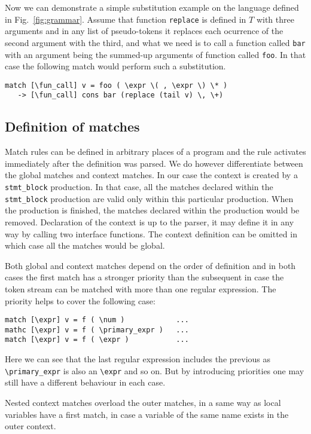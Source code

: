 Now we can demonstrate a simple substitution example on the language
defined in Fig.~\ref{fig:grammar}.  Assume that function \verb|replace|
is defined in $T$ with three arguments and in any list of pseudo-tokens
it replaces each ocurrence of the second argument with the third, 
and what we need is to call a function called \verb|bar| with an 
argument being the summed-up arguments of function called \verb|foo|.
In that case the following match would perform such a substitution.
\begin{verbatim}
match [\fun_call] v = foo ( \expr \( , \expr \) \* )
   -> [\fun_call] cons bar (replace (tail v) \, \+)
\end{verbatim}

\subsection{Definition of matches}
Match rules can be defined in arbitrary places of a program
and the rule activates immediately after the definition was parsed.
We do however differentiate between the global matches and context
matches.  In our case the context is created by a \verb|stmt_block|
production.  In that case, all the matches declared within the 
\verb|stmt_block| production are valid only within this particular
production.  When the production is finished, the matches declared
within the production would be removed.  Declaration of the context
is up to the parser, it may define it in any way by calling 
two interface functions.  The context definition can be omitted in
which case all the matches would be global.

Both global and context matches depend on the order of definition
and in both cases the first match has a stronger priority than the
subsequent in case the token stream can be matched with more than
one regular expression.  The priority helps to cover the following
case:
\begin{verbatim}
match [\expr] v = f ( \num )            ...
mathc [\expr] v = f ( \primary_expr )   ...
match [\expr] v = f ( \expr )           ...
\end{verbatim}
Here we can see that the last regular expression includes the 
previous as \verb|\primary_expr| is also an \verb|\expr| and
so on.  But by introducing priorities one may still have a different
behaviour in each case.

Nested context matches overload the outer matches, in a same
way as local variables have a first match, in case a variable
of the same name exists in the outer context.

